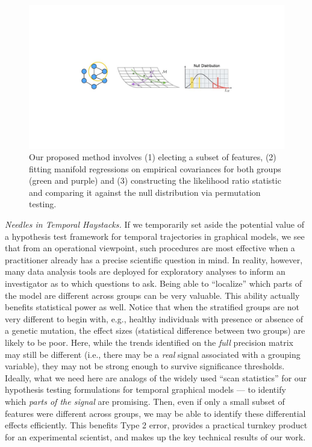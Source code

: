 \begin{figure}[h]
    \centering
    \includegraphics[width=\columnwidth,trim={6.5cm 7.5cm 6.5cm 7.5cm},clip]{diss/3_covtraj/figs/method.jpg}
    \caption[Covariance Trajectory Pipeline]{\small\label{fig:model} Our proposed method involves (1) electing a subset of features, (2) fitting manifold regressions on empirical covariances for both groups (green and purple) and (3) constructing the likelihood ratio statistic and comparing it against the null distribution via permutation testing.}
\end{figure}

{\em Needles in Temporal Haystacks.} If we temporarily set aside the potential value of a hypothesis test framework for temporal 
trajectories in graphical models, we see that
from an operational viewpoint, such procedures are most effective when a practitioner already has a precise scientific question in mind. In reality, however, 
many data analysis tools are deployed for exploratory analyses to inform an investigator as to which questions to ask. 
Being able to ``localize'' which parts of the model are different across groups can be very valuable. This ability actually 
benefits statistical power as well. Notice that when the stratified groups are not very different 
to begin with, e.g., healthy individuals with presence or absence of a genetic mutation, the
effect sizes (statistical difference between two groups) are likely to be poor.
Here, while the trends identified on the {\em full} precision matrix may still be different (i.e., there may be a {\em real} signal 
associated with a grouping variable), 
they may not be strong enough to survive significance thresholds. Ideally, what we need here are analogs of the widely used ``scan statistics'' 
for our hypothesis testing formulations for temporal graphical models --- to identify which {\em parts of the signal} are promising. 
Then, even if only a small subset of 
features were different across groups,
we may be able to identify these differential effects efficiently. This benefits Type 2 error, 
provides a practical turnkey product for an experimental scientist, and makes up the key technical results of our work.

